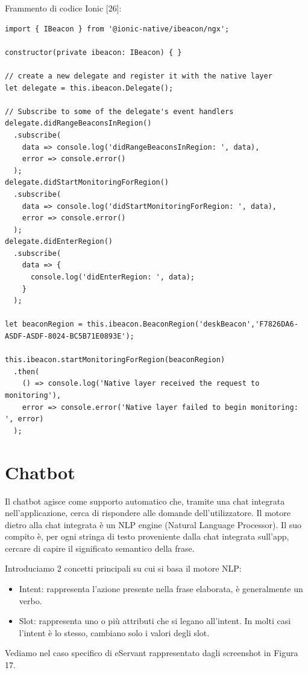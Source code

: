 Frammento di codice Ionic [26]:
\begin{lstlisting}
import { IBeacon } from '@ionic-native/ibeacon/ngx';

constructor(private ibeacon: IBeacon) { }

// create a new delegate and register it with the native layer
let delegate = this.ibeacon.Delegate();

// Subscribe to some of the delegate's event handlers
delegate.didRangeBeaconsInRegion()
  .subscribe(
    data => console.log('didRangeBeaconsInRegion: ', data),
    error => console.error()
  );
delegate.didStartMonitoringForRegion()
  .subscribe(
    data => console.log('didStartMonitoringForRegion: ', data),
    error => console.error()
  );
delegate.didEnterRegion()
  .subscribe(
    data => {
      console.log('didEnterRegion: ', data);
    }
  );

let beaconRegion = this.ibeacon.BeaconRegion('deskBeacon','F7826DA6-ASDF-ASDF-8024-BC5B71E0893E');

this.ibeacon.startMonitoringForRegion(beaconRegion)
  .then(
    () => console.log('Native layer received the request to monitoring'),
    error => console.error('Native layer failed to begin monitoring: ', error)
  );
\end{lstlisting}

\section{Chatbot}

Il chatbot agisce come supporto automatico che, tramite una chat integrata nell'applicazione, cerca di rispondere
alle domande dell'utilizzatore.
Il motore dietro alla chat integrata è un NLP engine (Natural Language Processor).
Il suo compito è, per ogni stringa di testo proveniente dalla chat integrata sull'app, cercare di capire
il significato semantico della frase.

Introduciamo 2 concetti principali su cui si basa il motore NLP:

\begin{itemize}
\item Intent: rappresenta l'azione presente nella frase elaborata, è generalmente un verbo.
\item Slot: rappresenta uno o più attributi che si legano all'intent. In molti casi l'intent è lo stesso,
cambiano solo i valori degli slot.
\end{itemize}

Vediamo nel caso specifico di eServant rappresentato dagli screenshot in Figura 17.

